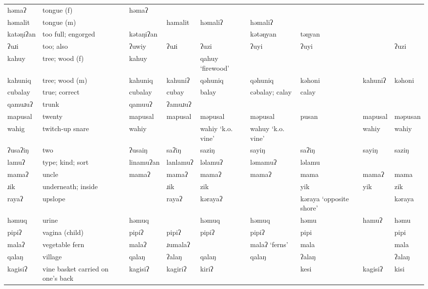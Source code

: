 \begin{landscape}
\begin{longtable}{*{9}{>{\raggedright\arraybackslash}p{}}}
\text{*}həmaʔ        & tongue (f) & həmaʔ &  &  &  &  &  & \\
\text{*}həmalit      & tongue (m) &  & hamalit & həmaliʔ & həmaliʔ &  &  & \\
\text{*}katəŋiʔan    & too full; engorged & kətaŋiʔan &  &  & kətəŋyan & təŋyan &  & \\
\text{*}ʔuɹi         & too; also & ʔuwiy & ʔuɹi & ʔuzi & ʔuyi & ʔuyi &  & ʔuzi\\
\text{*}kahuy        & tree; wood (f) & kahuy &  & qahuy \newline `firewood' &  &  &  & \\
\text{*}kahuniq      & tree; wood (m) & kahuniq & kahuniʔ & qəhuniq & qəhuniq & kəhoni & kahuniʔ & kəhoni\\
\text{*}cubalay      & true; correct & cubalay & cubay & balay & cəbalay; calay & calay &  & \\
\text{*}qamuɹuʔ      & trunk & qamuuʔ & ʔamuɹuʔ &  &  &  &  & \\
\text{*}mapusal      & twenty & mapusal & mapusal & məpusal & məpusal & pusan & mapusal & məpusan\\
\text{*}wahig        & twitch-up snare & wahiy &  & wahiy \newline `k.o. vine' & wahuy \newline `k.o. vine' &  & wahiy & wahiy\\
\text{*}ʔusaʔiŋ      & two & ʔusaiŋ & saʔiŋ & saziŋ & sayiŋ & saʔiŋ & sayiŋ & saziŋ\\
\text{*}lamuʔ       & type; kind; sort & linamuʔan & lanlamuʔ & ləlamuʔ & ləmamuʔ & ləlamu &  & \\
\text{*}mamaʔ        & uncle & mamaʔ & mamaʔ & mamaʔ & mamaʔ & mama & mamaʔ & mama\\
\text{*}ɹik          & underneath; inside &  & ɹik & zik &  & yik & yik & zik\\
\text{*}rayaʔ        & upslope &  & rayaʔ & kərayaʔ &  & kəraya `opposite shore' &  & kəraya\\
\text{*}həmuq        & urine & həmuq &  & həmuq & həmuq & həmu & hamuʔ & həmu\\
\text{*}pipiʔ        & vagina (child) & pipiʔ & pipiʔ & pipiʔ & pipiʔ & pipi &  & pipi\\
\text{*}malaʔ       & vegetable fern & malaʔ & ɹumalaʔ &  & malaʔ `ferns' & mala &  & mala\\
\text{*}qalaŋ        & village & qalaŋ & ʔalaŋ & qalaŋ & qalaŋ & ʔalaŋ &  & ʔalaŋ\\
\text{*}kagisiʔ      & vine basket carried on one's back & kagisiʔ & kagiriʔ & kiriʔ &  & kesi & kagisiʔ & kisi\\

\end{longtable}
\end{landscape}
